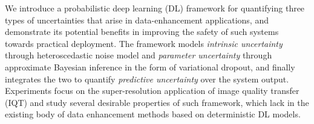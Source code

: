 We introduce a probabilistic deep learning (DL) framework for quantifying three types of uncertainties that arise in data-enhancement applications, and demonstrate its potential benefits in improving the safety of such systems towards practical deployment. The framework models \textit{intrinsic uncertainty} through heteroscedastic noise model and \textit{parameter uncertainty} through approximate Bayesian inference in the form of variational dropout, and finally integrates the two to quantify \textit{predictive uncertainty} over the system output.  Experiments focus on the super-resolution application of image quality transfer (IQT)\cite{alexander2017image} and study several desirable properties of such framework, which lack in the existing body of data enhancement methods based on deterministic DL models. 


